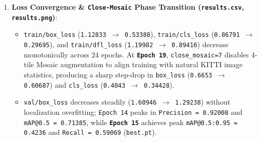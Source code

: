 \documentclass[10.5pt,a4paper]{article}
\begin{document}
\begin{enumerate}[leftmargin=1.8em,itemsep=2pt]
\item \textbf{Loss Convergence \& \texttt{Close-\allowbreak{}Mosaic} Phase Transition (\texttt{results.\allowbreak{}csv}, \texttt{results.\allowbreak{}png})}:
\begin{itemize}[leftmargin=1.5em,itemsep=2pt]
\item \texttt{train/\allowbreak{}box\_\allowbreak{}loss} (\texttt{1.\allowbreak{}12833 $\rightarrow$ 0.\allowbreak{}53388}), \texttt{train/\allowbreak{}cls\_\allowbreak{}loss} (\texttt{0.\allowbreak{}86791 $\rightarrow$ 0.\allowbreak{}29695}), and \texttt{train/\allowbreak{}dfl\_\allowbreak{}loss} (\texttt{1.\allowbreak{}19982 $\rightarrow$ 0.\allowbreak{}89416}) decrease monotonically across 24 epochs. At \textbf{\texttt{Epoch 19}}, \texttt{close\_\allowbreak{}mosaic=7} disables 4-tile Mosaic augmentation to align training with natural KITTI image statistics, producing a sharp step-drop in \texttt{box\_\allowbreak{}loss} (\texttt{0.\allowbreak{}6653 $\rightarrow$ 0.\allowbreak{}60687}) and \texttt{cls\_\allowbreak{}loss} (\texttt{0.\allowbreak{}4043 $\rightarrow$ 0.\allowbreak{}34428}).
\item \texttt{val/\allowbreak{}box\_\allowbreak{}loss} decreases steadily (\texttt{1.\allowbreak{}60946 $\rightarrow$ 1.\allowbreak{}29238}) without localization overfitting; \texttt{Epoch 14} peaks in \texttt{Precision = 0.\allowbreak{}92008} and \texttt{mAP@0.\allowbreak{}5 = 0.\allowbreak{}71385}, while \textbf{\texttt{Epoch 15}} achieves peak \texttt{mAP@0.\allowbreak{}5:\allowbreak{}0.\allowbreak{}95 = 0.\allowbreak{}4236} and \texttt{Recall = 0.\allowbreak{}59069} (\texttt{best.\allowbreak{}pt}).
\end{itemize}
\end{enumerate}
\end{document}

